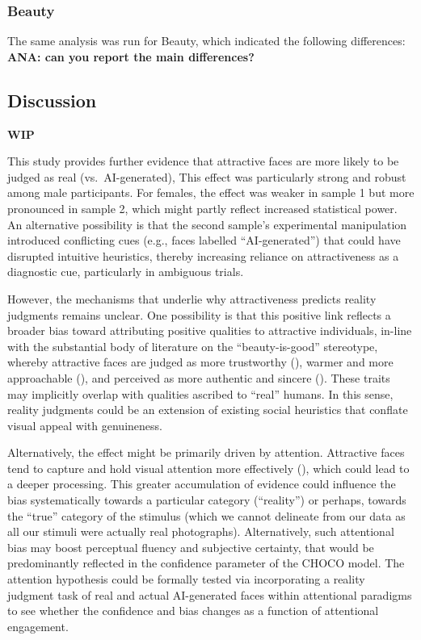 \documentclass[
  jou,
  floatsintext,
  longtable,
  nolmodern,
  notxfonts,
  notimes,
  colorlinks=true,linkcolor=blue,citecolor=blue,urlcolor=blue]{apa7}
\begin{document}
\subsubsection{Beauty}\label{beauty}

The same analysis was run for Beauty, which indicated the following
differences: \textbf{ANA: can you report the main differences?}

\subsection{Discussion}\label{discussion-1}

\textbf{WIP}

This study provides further evidence that attractive faces are more
likely to be judged as real (vs.~AI-generated), This effect was
particularly strong and robust among male participants. For females, the
effect was weaker in sample 1 but more pronounced in sample 2, which
might partly reflect increased statistical power. An alternative
possibility is that the second sample's experimental manipulation
introduced conflicting cues (e.g., faces labelled ``AI-generated'') that
could have disrupted intuitive heuristics, thereby increasing reliance
on attractiveness as a diagnostic cue, particularly in ambiguous trials.

However, the mechanisms that underlie why attractiveness predicts
reality judgments remains unclear. One possibility is that this positive
link reflects a broader bias toward attributing positive qualities to
attractive individuals, in-line with the substantial body of literature
on the ``beauty-is-good'' stereotype, whereby attractive faces are
judged as more trustworthy (), warmer and more approachable
(), and perceived as
more authentic and sincere (). These traits may implicitly overlap with qualities ascribed to
``real'' humans. In this sense, reality judgments could be an extension
of existing social heuristics that conflate visual appeal with
genuineness.

Alternatively, the effect might be primarily driven by attention.
Attractive faces tend to capture and hold visual attention more
effectively (), which could lead to a deeper processing. This greater
accumulation of evidence could influence the bias systematically towards
a particular category (``reality'') or perhaps, towards the ``true''
category of the stimulus (which we cannot delineate from our data as all
our stimuli were actually real photographs). Alternatively, such
attentional bias may boost perceptual fluency and subjective certainty,
that would be predominantly reflected in the confidence parameter of the
CHOCO model. The attention hypothesis could be formally tested via
incorporating a reality judgment task of real and actual AI-generated
faces within attentional paradigms to see whether the confidence and
bias changes as a function of attentional engagement.
\end{document}
